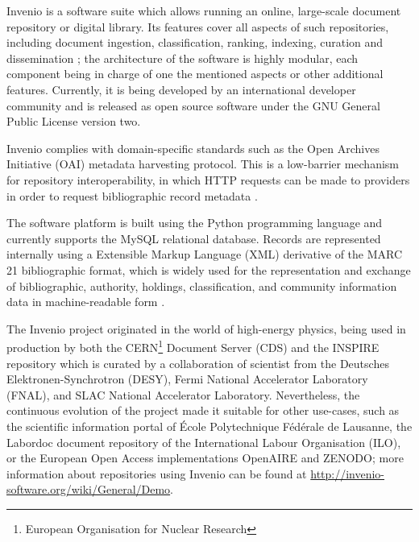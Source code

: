 
Invenio \cite{ref:invenio} is a software suite which allows running an online,
large-scale document repository or digital library. Its features cover all
aspects of such repositories, including document ingestion, classification,
ranking, indexing, curation and dissemination \cite{ref:kaplun, ref:glauner};
the architecture of the software is highly modular, each component being in
charge of one the mentioned aspects or other additional features. Currently, it
is being developed by an international developer community and is released as
open source software under the GNU General Public License version two.

Invenio complies with domain-specific standards such as the Open Archives
Initiative (OAI) metadata harvesting protocol. This is a low-barrier mechanism for
repository interoperability, in which HTTP requests can be made to providers in
order to request bibliographic record metadata \cite{ref:oai}.

The software platform is built using the Python programming language and
currently supports the MySQL relational database. Records are represented
internally using a Extensible Markup Language (XML) derivative of the MARC 21
bibliographic format, which is widely used for the representation and exchange
of bibliographic, authority, holdings, classification, and community
information data in machine-readable form \cite{ref:marc}.

The Invenio project originated in the world of high-energy physics, being used
in production by both the CERN\footnote{European Organisation for Nuclear
Research} Document Server (CDS) and the INSPIRE repository which is curated
by a collaboration of scientist from the Deutsches Elektronen-Synchrotron
(DESY), Fermi National Accelerator Laboratory (FNAL), and SLAC National
Accelerator Laboratory. Nevertheless, the continuous evolution of the project
made it suitable for other use-cases, such as the scientific information portal
of \'{E}cole Polytechnique F\'{e}d\'{e}rale de Lausanne, the Labordoc document
repository of the International Labour Organisation (ILO), or the European Open
Access implementations OpenAIRE and ZENODO; more information about repositories
using Invenio can be found at
\url{http://invenio-software.org/wiki/General/Demo}.
